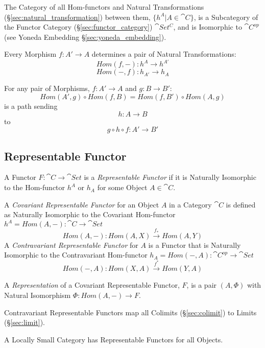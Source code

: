 The Category of all Hom-functors and Natural Transformations
(\S\ref{sec:natural_transformation}) between them, $\{ h^A | A \in
\cat{C} \}$, is a Subcategory of the Functor Category
(\S\ref{sec:functor_category}) $\cat{Set^C}$, and is Isomorphic to
$\cat{C^{op}}$ (see Yoneda Embedding \S\ref{sec:yoneda_embedding}).

Every Morphism $f : A' \rightarrow A$ determines a pair of Natural
Transformations:
\[
  Hom(f,-) : h^A \rightarrow h^{A'}
\]\[
  Hom(-,f) : h_{A'} \rightarrow h_A
\]

For any pair of Morphisms, $f : A' \rightarrow A$ and $g : B
\rightarrow B'$:
\[
  Hom(A',g) \circ Hom(f,B) = Hom(f,B') \circ Hom(A,g)
\]
is a path sending
\[
  h : A \rightarrow B
\]
to
\[
  g \circ h \circ f : A' \rightarrow B'
\]



\subsection{Representable Functor}\label{sec:representable_functor}

A Functor $F : \cat{C} \rightarrow \cat{Set}$ is a
\emph{Representable Functor} if it is Naturally Isomorphic to the
Hom-functor $h^A$ or $h_A$ for some Object $A \in \cat{C}$.

A \emph{Covariant Representable Functor} for an Object $A$ in a
Category $\cat{C}$ is defined as Naturally Isomorphic to the
Covariant Hom-functor $h^A = Hom(A,-) : \cat{C} \rightarrow
\cat{Set}$
\[
  Hom(A,-) : Hom(A,X) \xrightarrow{f_*} Hom(A,Y)
\]
A \emph{Contravariant Representable Functor} for $A$ is a Functor that
is Naturally Isomorphic to the Contravariant Hom-functor $h_A =
Hom(-,A) : \cat{C^{op}} \rightarrow \cat{Set}$
\[
  Hom(-,A) : Hom(X,A) \xrightarrow{f^*} Hom(Y,A)
\]

A \emph{Representation} of a Covariant Representable Functor, $F$, is
a pair $(A, \Phi)$ with Natural Isomorphism $\Phi : Hom(A,-)
\rightarrow F$.

Contravariant Representable Functors map all Colimits
(\S\ref{sec:colimit}) to Limits (\S\ref{sec:limit}).

A Locally Small Category has Representable Functors for all Objects.



